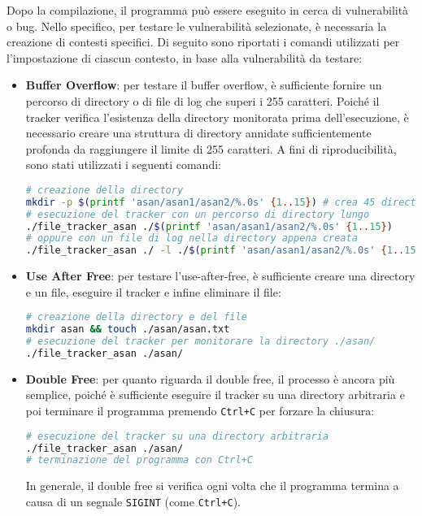 Dopo la compilazione, il programma può essere eseguito in cerca di vulnerabilità
o bug. Nello specifico, per testare le vulnerabilità selezionate, è necessaria
la creazione di contesti specifici. Di seguito sono riportati i comandi utilizzati
per l'impostazione di ciascun contesto, in base alla vulnerabilità da testare:
\begin{itemize}
  \item \textbf{Buffer Overflow}: per testare il buffer overflow, è sufficiente
    fornire un percorso di directory o di file di log che superi i 255 caratteri.
    Poiché il tracker verifica l'esistenza della directory monitorata prima dell'esecuzione,
    è necessario creare una struttura di directory annidate sufficientemente
    profonda da raggiungere il limite di 255 caratteri. A fini di riproducibilità,
    sono stati utilizzati i seguenti comandi: \begin{lstlisting}[language=bash, numbers=none]
# creazione della directory
mkdir -p $(printf 'asan/asan1/asan2/%.0s' {1..15}) # crea 45 directory annidate
# esecuzione del tracker con un percorso di directory lungo
./file_tracker_asan ./$(printf 'asan/asan1/asan2/%.0s' {1..15})
# oppure con un file di log nella directory appena creata
./file_tracker_asan ./ -l ./$(printf 'asan/asan1/asan2/%.0s' {1..15})logfile.log
    \end{lstlisting}

  \item \textbf{Use After Free}: per testare l'use-after-free, è sufficiente
    creare una directory e un file, eseguire il tracker e infine eliminare il file:
    \begin{lstlisting}[language=bash, numbers=none]
# creazione della directory e del file
mkdir asan && touch ./asan/asan.txt
# esecuzione del tracker per monitorare la directory ./asan/
./file_tracker_asan ./asan/
    \end{lstlisting}

  \item \textbf{Double Free}: per quanto riguarda il double free, il processo è
    ancora più semplice, poiché è sufficiente eseguire il tracker su una directory
    arbitraria e poi terminare il programma premendo \texttt{Ctrl+C} per forzare
    la chiusura: \begin{lstlisting}[language=bash, numbers=none]
# esecuzione del tracker su una directory arbitraria
./file_tracker_asan ./asan/
# terminazione del programma con Ctrl+C
    \end{lstlisting}
    In generale, il double free si verifica ogni volta che il programma termina
    a causa di un segnale \texttt{SIGINT} (come \texttt{Ctrl+C}).
\end{itemize}

